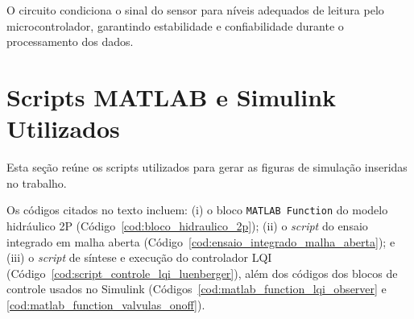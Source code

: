 O circuito condiciona o sinal do sensor para níveis adequados de leitura pelo microcontrolador, garantindo estabilidade e confiabilidade durante o processamento dos dados.








%  

%  

\section{Scripts MATLAB e Simulink Utilizados}
\label{ap:scripts-matlab}

Esta seção reúne os scripts utilizados para gerar as figuras de simulação inseridas no trabalho.

Os códigos citados no texto incluem: (i) o bloco \texttt{MATLAB Function} do modelo hidráulico 2P (Código~\ref{cod:bloco_hidraulico_2p}); (ii) o \textit{script} do ensaio integrado em malha aberta (Código~\ref{cod:ensaio_integrado_malha_aberta}); e (iii) o \textit{script} de síntese e execução do controlador LQI (Código~\ref{cod:script_controle_lqi_luenberger}), além dos códigos dos blocos de controle usados no Simulink (Códigos~\ref{cod:matlab_function_lqi_observer} e \ref{cod:matlab_function_valvulas_onoff}).


